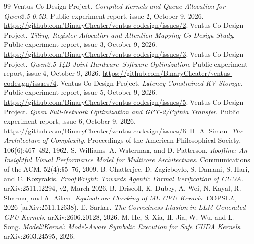 \documentclass[11pt]{article}
\begin{document}
\begin{thebibliography}{99}
 Ventus Co-Design Project. \emph{Compiled Kernels and Queue Allocation for Qwen2.5-0.5B}. Public experiment report, issue 2, October 9, 2026. \url{https://github.com/BinaryCheater/ventus-codesign/issues/2}.
 Ventus Co-Design Project. \emph{Tiling, Register Allocation and Attention-Mapping Co-Design Study}. Public experiment report, issue 3, October 9, 2026. \url{https://github.com/BinaryCheater/ventus-codesign/issues/3}.
 Ventus Co-Design Project. \emph{Qwen2.5-14B Joint Hardware--Software Optimization}. Public experiment report, issue 4, October 9, 2026. \url{https://github.com/BinaryCheater/ventus-codesign/issues/4}.
 Ventus Co-Design Project. \emph{Latency-Constrained KV Storage}. Public experiment report, issue 5, October 9, 2026. \url{https://github.com/BinaryCheater/ventus-codesign/issues/5}.
 Ventus Co-Design Project. \emph{Qwen Full-Network Optimization and GPT-2/Pythia Transfer}. Public experiment report, issue 6, October 9, 2026. \url{https://github.com/BinaryCheater/ventus-codesign/issues/6}.
 H. A. Simon. \emph{The Architecture of Complexity}. Proceedings of the American Philosophical Society, 106(6):467--482, 1962.
 S. Williams, A. Waterman, and D. Patterson. \emph{Roofline: An Insightful Visual Performance Model for Multicore Architectures}. Communications of the ACM, 52(4):65--76, 2009.
 B. Chatterjee, D. Zagieboylo, S. Damani, S. Hari, and C. Kozyrakis. \emph{ProofWright: Towards Agentic Formal Verification of CUDA}. arXiv:2511.12294, v2, March 2026.
 B. Driscoll, K. Dubey, A. Wei, N. Kayal, R. Sharma, and A. Aiken. \emph{Equivalence Checking of ML GPU Kernels}. OOPSLA, 2026 (arXiv:2511.12638).
 D. Sarkar. \emph{The Correctness Illusion in LLM-Generated GPU Kernels}. arXiv:2606.20128, 2026.
 M. He, S. Xia, H. Jia, W. Wu, and L. Song. \emph{Model2Kernel: Model-Aware Symbolic Execution for Safe CUDA Kernels}. arXiv:2603.24595, 2026.
\end{thebibliography}
\end{document}
